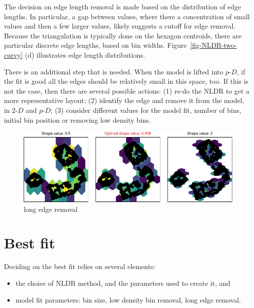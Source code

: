 \documentclass[
  12pt]{article}
\providecommand{\tightlist}{%
  \setlength{\itemsep}{0pt}\setlength{\parskip}{0pt}}\usepackage{longtable,booktabs,array}
\def\tightlist{}
\newcommand\pD{$p\text{-}D$}
\newcommand\gD{$2\text{-}D$}
\begin{document}
The decision on edge length removal is made based on the distribution of
edge lengths. In particular, a gap between values, where there a
concentration of small values and then a few larger values, likely
suggests a cutoff for edge removal. Because the triangulation is
typically done on the hexagon centroids, there are particular discrete
edge lengths, based on bin widths. Figure~\ref{fig-NLDR-two-curvy} (d)
illustrates edge length distributions.

There is an additional step that is needed. When the model is lifted
into \pD{}, if the fit is good all the edges should be relatively small
in this space, too. If this is not the case, then there are several
possible actions: (1) re-do the NLDR to get a more representative
layout; (2) identify the edge and remove it from the model, in \gD{} and
\pD{}; (3) consider different values for the model fit, number of bins,
initial bin position or removing low density bins.

\begin{figure}[H]

{\centering \includegraphics[width=1\textwidth,height=\textheight]{paper_files/figure-pdf/unnamed-chunk-34-1.pdf}

}

\caption{long edge removal}

\end{figure}%

\section{Best fit}\label{best-fit}

Deciding on the best fit relies on several elements:

\begin{itemize}
\tightlist
\item
  the choice of NLDR method, and the parameters used to create it, and
\item
  model fit parameters: bin size, low density bin removal, long edge
  removal.
\end{itemize}
\end{document}
